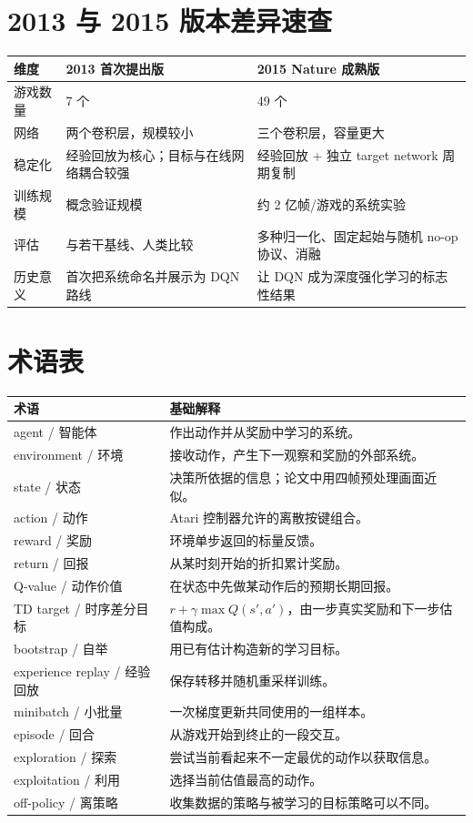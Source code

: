 \documentclass[UTF8,11pt]{ctexart}
\begin{document}
\section{2013 与 2015 版本差异速查}
\begin{longtable}{p{}p{}p{}}
\toprule
维度 & 2013 首次提出版 & 2015 Nature 成熟版\\
\midrule
游戏数量 & 7 个 & 49 个\\
网络 & 两个卷积层，规模较小 & 三个卷积层，容量更大\\
稳定化 & 经验回放为核心；目标与在线网络耦合较强 & 经验回放 + 独立 target network 周期复制\\
训练规模 & 概念验证规模 & 约 2 亿帧/游戏的系统实验\\
评估 & 与若干基线、人类比较 & 多种归一化、固定起始与随机 no-op 协议、消融\\
历史意义 & 首次把系统命名并展示为 DQN 路线 & 让 DQN 成为深度强化学习的标志性结果\\
\bottomrule
\end{longtable}

\section{术语表}
\begin{longtable}{p{}p{}}
\toprule
术语 & 基础解释\\
\midrule
agent / 智能体 & 作出动作并从奖励中学习的系统。\\
environment / 环境 & 接收动作，产生下一观察和奖励的外部系统。\\
state / 状态 & 决策所依据的信息；论文中用四帧预处理画面近似。\\
action / 动作 & Atari 控制器允许的离散按键组合。\\
reward / 奖励 & 环境单步返回的标量反馈。\\
return / 回报 & 从某时刻开始的折扣累计奖励。\\
Q-value / 动作价值 & 在状态中先做某动作后的预期长期回报。\\
TD target / 时序差分目标 & $r+\gamma\max Q(s',a')$，由一步真实奖励和下一步估值构成。\\
bootstrap / 自举 & 用已有估计构造新的学习目标。\\
experience replay / 经验回放 & 保存转移并随机重采样训练。\\
minibatch / 小批量 & 一次梯度更新共同使用的一组样本。\\
episode / 回合 & 从游戏开始到终止的一段交互。\\
exploration / 探索 & 尝试当前看起来不一定最优的动作以获取信息。\\
exploitation / 利用 & 选择当前估值最高的动作。\\
off-policy / 离策略 & 收集数据的策略与被学习的目标策略可以不同。\\
\bottomrule
\end{longtable}
\end{document}
